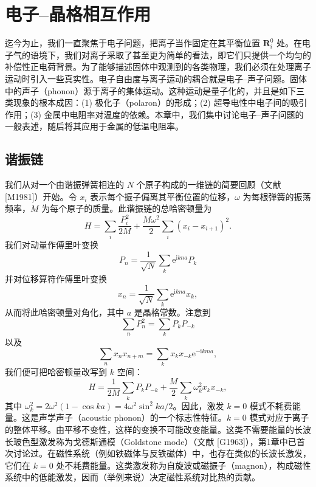 \chapter{电子–晶格相互作用}

迄今为止，我们一直聚焦于电子问题，把离子当作固定在其平衡位置 $\mathbf{R}_i^0$ 处。在电子气的语境下，我们对离子采取了甚至更为简单的看法，即它们只提供一个均匀的补偿性正电荷背景。为了能够描述固体中观测到的各类物理，我们必须在处理离子运动时引入一些真实性。电子自由度与离子运动的耦合就是电子–声子问题。固体中的声子（phonon）源于离子的集体运动。这种运动是量子化的，并且是如下三类现象的根本成因：(1) 极化子（polaron）的形成；(2) 超导电性中电子间的吸引作用；(3) 金属中电阻率对温度的依赖。本章中，我们集中讨论电子–声子问题的一般表述，随后将其应用于金属的低温电阻率。

\section{谐振链}

我们从对一个由谐振弹簧相连的 $N$ 个原子构成的一维链的简要回顾（文献 [M1981]）开始。令 $x_i$ 表示每个振子偏离其平衡位置的位移，$\omega$ 为每根弹簧的振荡频率，$M$ 为每个原子的质量。此谐振链的总哈密顿量为
\begin{equation*}
H=\sum_i\frac{P_i^2}{2M}+\frac{M\omega^2}{2}\sum_i(x_i-x_{i+1})^2.\tag{11.1}
\end{equation*}
我们对动量作傅里叶变换
\begin{equation*}
P_n=\frac{1}{\sqrt{N}}\sum_k\mathrm{e}^{\mathrm{i}kna}P_k\tag{11.2}
\end{equation*}
并对位移算符作傅里叶变换
\begin{equation*}
x_n=\frac{1}{\sqrt{N}}\sum_k\mathrm{e}^{\mathrm{i}kna}x_k,\tag{11.3}
\end{equation*}
从而将此哈密顿量对角化，其中 $a$ 是晶格常数。注意到
\begin{equation*}
\sum_n P_n^2=\sum_k P_kP_{-k}\tag{11.4}
\end{equation*}
以及
\begin{equation*}
\sum_n x_nx_{n+m}=\sum_k x_kx_{-k}\mathrm{e}^{-\mathrm{i}kma},\tag{11.5}
\end{equation*}
我们便可把哈密顿量改写到 $k$ 空间：
\begin{equation*}
H=\frac{1}{2M}\sum_k P_kP_{-k}+\frac{M}{2}\sum_k\omega_k^2x_kx_{-k},\tag{11.6}
\end{equation*}
其中 $\omega_k^2=2\omega^2(1-\cos ka)=4\omega^2\sin^2 ka/2$。因此，激发 $k=0$ 模式不耗费能量。这是声学声子（acoustic phonon）的一个标志性特征。$k=0$ 模式对应于离子的整体平移。由平移不变性，这样的变换不可能改变能量。这类不需要能量的长波长玻色型激发称为戈德斯通模（Goldstone mode）（文献 [G1963]），第1章中已首次讨论过。在磁性系统（例如铁磁体与反铁磁体）中，也存在类似的长波长激发，它们在 $k=0$ 处不耗费能量。这类激发称为自旋波或磁振子（magnon），构成磁性系统中的低能激发，因而（举例来说）决定磁性系统对比热的贡献。

